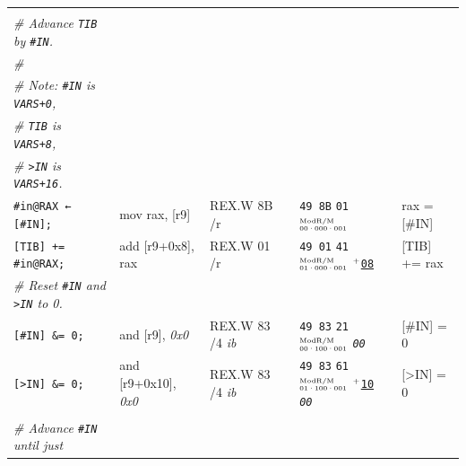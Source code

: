 \documentclass[a4paper,12pt,final]{article}
\begin{document}
\begin{table}[!htbp]
\begin{adjustwidth}{-1cm}{-1cm}
\begin{center}
\begin{tabular}{l|ll|l|lH}
\hspace{1em} &  &  &  &  & \\[0pt]
\hspace{1em} \emph{\# Advance \texttt{TIB}​ by \texttt{\#IN}.} &  &  &  &  & \\[0pt]
\hspace{1em} \emph{\#} &  &  &  &  & \\[0pt]
\hspace{1em} \emph{\# Note:         \texttt{\#IN} is \texttt{VARS+0},} &  &  &  &  & \\[0pt]
\hspace{1em} \emph{\# \hspace{2.35em} \texttt{TIB} is \texttt{VARS+8},} &  &  &  &  & \\[0pt]
\hspace{1em} \emph{\# \hspace{2.35em} \texttt{>IN} is \texttt{VARS+16}.} &  &  &  &  & \\[0pt]
\hspace{1em} \texttt{\#in@RAX ← [\#IN];} & mov rax, [r9] & REX.W 8B /r &  & \texttt{49 8B} \texttt{01}​\(^{\text{\tiny ModR/M}}_{\text{\tiny 00·000·001}}\) & rax = [\#IN]\\[0pt]
\hspace{1em} \texttt{[TIB] += \#in@RAX;} & add [r9+0x8], rax & REX.W 01 /r &  & \texttt{49 01} \texttt{41}​\(^{\text{\tiny ModR/M}}_{\text{\tiny 01·000·001}}\) \(^{\text{\tiny +}}\)​\uline{\texttt{08}} & [TIB] += rax\\[0pt]
\hspace{1em} \emph{\# Reset \texttt{\#IN} and \texttt{>IN} to 0.} &  &  &  &  & \\[0pt]
\hspace{1em} \texttt{[\#IN] \&= 0;} & and [r9], \emph{0x0} & REX.W 83 /​4 \emph{ib} &  & \texttt{49 83} \texttt{21}​\(^{\text{\tiny ModR/M}}_{\text{\tiny 00·100·001}}\) \emph{\texttt{00}} & [\#IN] = 0\\[0pt]
\hspace{1em} \texttt{[>IN] \&= 0;} & and [r9+0x10], \emph{0x0} & REX.W 83 /​4 \emph{ib} &  & \texttt{49 83} \texttt{61}​\(^{\text{\tiny ModR/M}}_{\text{\tiny 01·100·001}}\) \(^{\text{\tiny +}}\)​\uline{\texttt{10}} \emph{\texttt{00}} & [>IN] = 0\\[0pt]
\hspace{1em} &  &  &  &  & \\[0pt]
\hspace{1em} \emph{\# Advance \texttt{\#IN} until just} &  &  &  &  & \\[0pt]

\end{tabular}
\end{center}
\end{adjustwidth}
\end{table}
\end{document}
